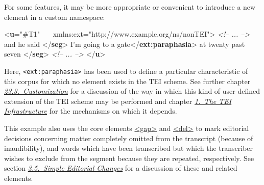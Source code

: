 For some features, it may be more appropriate or convenient to introduce a new element in a custom namespace: \par\bgroup{}\exampleFont \begin{shaded}\noindent\mbox{}{<\textbf{u}\hspace*{1em}{who}="{\#T1}"\mbox{}\newline 
   xmlns:ext="http://www.example.org/ns/nonTEI">}\mbox{}\newline 
\textit{<!-- ... -->}\mbox{}\newline 
{}and he said {</\textbf{seg}>}\mbox{}\newline 
{}I'm going to a\mbox{}\newline 
{}gate{</\textbf{ext:paraphasia}>}\mbox{}\newline 
\hspace*{1em}\hspace*{1em} at twenty past seven {</\textbf{seg}>}\mbox{}\newline 
\textit{<!-- ... -->}\mbox{}\newline 
{</\textbf{u}>}\end{shaded}\egroup\par \noindent  Here, \texttt{<ext:paraphasia>} has been used to define a particular characteristic of this corpus for which no element exists in the TEI scheme. See further chapter \textit{\hyperref[MD]{23.3.\ Customization}} for a discussion of the way in which this kind of user-defined extension of the TEI scheme may be performed and chapter \textit{\hyperref[ST]{1.\ The TEI Infrastructure}} for the mechanisms on which it depends.\par
This example also uses the core elements \hyperref[TEI.gap]{<gap>} and \hyperref[TEI.del]{<del>} to mark editorial decisions concerning matter completely omitted from the transcript (because of inaudibility), and words which have been transcribed but which the transcriber wishes to exclude from the segment because they are repeated, respectively. See section \textit{\hyperref[COED]{3.5.\ Simple Editorial Changes}} for a discussion of these and related elements.\par
